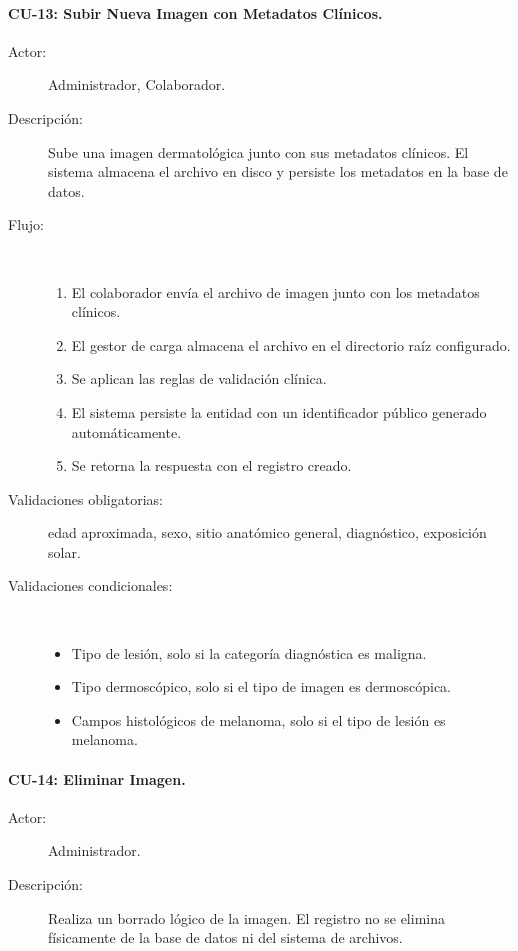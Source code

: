 \paragraph{CU-13: Subir Nueva Imagen con Metadatos Clínicos.}
\begin{description}
    \item[Actor:] Administrador, Colaborador.
    \item[Descripción:] Sube una imagen dermatológica junto con sus metadatos clínicos. El sistema almacena el archivo en disco y persiste los metadatos en la base de datos.
    \item[Flujo:]~
    \begin{enumerate}
        \item El colaborador envía el archivo de imagen junto con los metadatos clínicos.
        \item El gestor de carga almacena el archivo en el directorio raíz configurado.
        \item Se aplican las reglas de validación clínica.
        \item El sistema persiste la entidad con un identificador público generado automáticamente.
        \item Se retorna la respuesta con el registro creado.
    \end{enumerate}
    \item[Validaciones obligatorias:] edad aproximada, sexo, sitio anatómico general, diagnóstico, exposición solar.
    \item[Validaciones condicionales:]~
    \begin{itemize}
        \item Tipo de lesión, solo si la categoría diagnóstica es maligna.
        \item Tipo dermoscópico, solo si el tipo de imagen es dermoscópica.
        \item Campos histológicos de melanoma, solo si el tipo de lesión es melanoma.
    \end{itemize}
\end{description}

\paragraph{CU-14: Eliminar Imagen.}
\begin{description}
    \item[Actor:] Administrador.
    \item[Descripción:] Realiza un borrado lógico de la imagen. El registro no se elimina físicamente de la base de datos ni del sistema de archivos.
\end{description}

